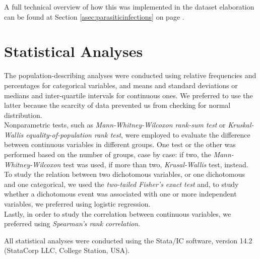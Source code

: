 A full technical overview of how this was implemented in the dataset elaboration can be found at Section \ref{asec:parasiticinfections} on page \pageref{asec:parasiticinfections}.


\section{Statistical Analyses}\label{sec:statisticalanalyses}
The population-describing analyses were conducted using relative frequencies and percentages for categorical variables, and means and standard deviations or medians and inter-quartile intervals for continuous ones. We preferred to use the latter because the scarcity of data prevented us from checking for normal distribution.\\
Nonparametric tests, such as \textit{Mann-Whitney-Wilcoxon rank-sum test} or \textit{Kruskal-Wallis equality-of-population rank test}, were employed to evaluate the difference between continuous variables in different groups. One test or the other was performed based on the number of groups, case by case: if two, the \textit{Mann-Whitney-Wilcoxon} test was used, if more than two, \textit{Krusal-Wallis} test, instead. To study the relation between two dichotomous variables, or one dichotomous and one categorical, we used the \textit{two-tailed Fisher's exact test} and, to study whether a dichotomous event was associated with one or more independent variables, we preferred using logistic regression.\\
Lastly, in order to study the correlation between continuous variables, we preferred using \textit{Spearman's rank correlation}.

All statistical analyses were conducted using the Stata/IC software, version 14.2 (StataCorp LLC, College Station, USA).